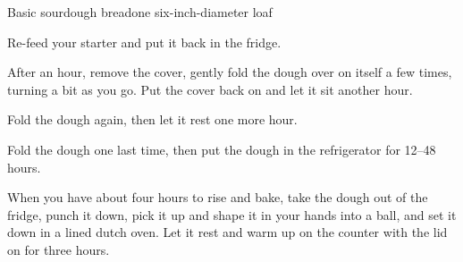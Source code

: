 \documentclass{article}
\begin{document}
\begin{recipe}{Basic sourdough bread}{one six-inch-diameter loaf}
\begin{step}
    \end{step}
    \begin{step}
      \begin{ingrs}
      \end{ingrs}
      \begin{stepdesc}
        Re-feed your starter and put it back in the fridge.
      \end{stepdesc}
    \end{step}
    \begin{step}
      \begin{ingrs}
      \end{ingrs}
      \begin{stepdesc}
        After an hour, remove the cover, gently fold the dough over on itself a few times, turning a bit as you go. Put the cover back on and let it sit another hour.
      \end{stepdesc}
    \end{step}
    \begin{step}
      \begin{ingrs}
      \end{ingrs}
      \begin{stepdesc}
        Fold the dough again, then let it rest one more hour.
      \end{stepdesc}
    \end{step}
    \begin{step}
      \begin{ingrs}
      \end{ingrs}
      \begin{stepdesc}
        Fold the dough one last time, then put the dough in the refrigerator for 12--48 hours.
      \end{stepdesc}
    \end{step}
    \begin{step}
      \begin{ingrs}
      \end{ingrs}
      \begin{stepdesc}
        When you have about four hours to rise and bake, take the dough out of the fridge, punch it down, pick it up and shape it in your hands into a ball, and set it down in a lined dutch oven. Let it rest and warm up on the counter with the lid on for three hours.
      \end{stepdesc}
    \end{step}

\end{recipe}
\end{document}
